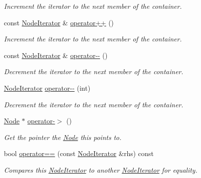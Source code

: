 \begin{DoxyCompactItemize}
\begin{DoxyCompactList}\small\item\em Increment the iterator to the next member of the container. \item\end{DoxyCompactList}\item 
\hypertarget{classMezzanine_1_1xml_1_1NodeIterator_a36c320c0016180001c9c5986efa476fd}{
const \hyperlink{classMezzanine_1_1xml_1_1NodeIterator}{NodeIterator} \& \hyperlink{classMezzanine_1_1xml_1_1NodeIterator_a36c320c0016180001c9c5986efa476fd}{operator++} ()}
\label{classMezzanine_1_1xml_1_1NodeIterator_a36c320c0016180001c9c5986efa476fd}

\begin{DoxyCompactList}\small\item\em Increment the iterator to the next member of the container. \item\end{DoxyCompactList}\item 
const \hyperlink{classMezzanine_1_1xml_1_1NodeIterator}{NodeIterator} \& \hyperlink{classMezzanine_1_1xml_1_1NodeIterator_abd768780cb9a803086025fecadccbaef}{operator-\/-\/} ()
\begin{DoxyCompactList}\small\item\em Decrement the iterator to the next member of the container. \item\end{DoxyCompactList}\item 
\hyperlink{classMezzanine_1_1xml_1_1NodeIterator}{NodeIterator} \hyperlink{classMezzanine_1_1xml_1_1NodeIterator_ac6285796bdf145273a9ea4d620584d58}{operator-\/-\/} (int)
\begin{DoxyCompactList}\small\item\em Decrement the iterator to the next member of the container. \item\end{DoxyCompactList}\item 
\hyperlink{classMezzanine_1_1xml_1_1Node}{Node} $\ast$ \hyperlink{classMezzanine_1_1xml_1_1NodeIterator_ab1fc992626c65c2cdbd46370c266d995}{operator-\/$>$} ()
\begin{DoxyCompactList}\small\item\em Get the pointer the \hyperlink{classMezzanine_1_1xml_1_1Node}{Node} this points to. \item\end{DoxyCompactList}\item 
bool \hyperlink{classMezzanine_1_1xml_1_1NodeIterator_a5b86316fe4753e8e0b240438159194a3}{operator==} (const \hyperlink{classMezzanine_1_1xml_1_1NodeIterator}{NodeIterator} \&rhs) const 
\begin{DoxyCompactList}\small\item\em Compares this \hyperlink{classMezzanine_1_1xml_1_1NodeIterator}{NodeIterator} to another \hyperlink{classMezzanine_1_1xml_1_1NodeIterator}{NodeIterator} for equality. \item\end{DoxyCompactList}\end{DoxyCompactItemize}
